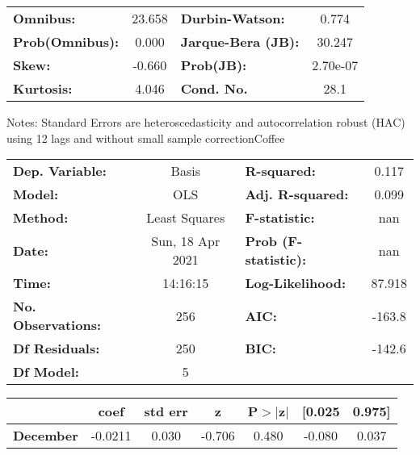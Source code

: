 \begin{center}
\begin{tabular}{lcccccc}
\bottomrule
\end{tabular}
\begin{tabular}{lclc}
\textbf{Omnibus:}       & 23.658 & \textbf{  Durbin-Watson:     } &    0.774  \\
\textbf{Prob(Omnibus):} &  0.000 & \textbf{  Jarque-Bera (JB):  } &   30.247  \\
\textbf{Skew:}          & -0.660 & \textbf{  Prob(JB):          } & 2.70e-07  \\
\textbf{Kurtosis:}      &  4.046 & \textbf{  Cond. No.          } &     28.1  \\
\bottomrule
\end{tabular}
\end{center}

Notes: \newline
 [1] Standard Errors are heteroscedasticity and autocorrelation robust (HAC) using 12 lags and without small sample correctionCoffee\begin{center}
\begin{tabular}{lclc}
\toprule
\textbf{Dep. Variable:}    &      Basis       & \textbf{  R-squared:         } &     0.117   \\
\textbf{Model:}            &       OLS        & \textbf{  Adj. R-squared:    } &     0.099   \\
\textbf{Method:}           &  Least Squares   & \textbf{  F-statistic:       } &       nan   \\
\textbf{Date:}             & Sun, 18 Apr 2021 & \textbf{  Prob (F-statistic):} &      nan    \\
\textbf{Time:}             &     14:16:15     & \textbf{  Log-Likelihood:    } &    87.918   \\
\textbf{No. Observations:} &         256      & \textbf{  AIC:               } &    -163.8   \\
\textbf{Df Residuals:}     &         250      & \textbf{  BIC:               } &    -142.6   \\
\textbf{Df Model:}         &           5      & \textbf{                     } &             \\
\bottomrule
\end{tabular}
\begin{tabular}{lcccccc}
                  & \textbf{coef} & \textbf{std err} & \textbf{z} & \textbf{P$> |$z$|$} & \textbf{[0.025} & \textbf{0.975]}  \\
\midrule
\textbf{December} &      -0.0211  &        0.030     &    -0.706  &         0.480        &       -0.080    &        0.037     \\

\end{tabular}
\end{center}
